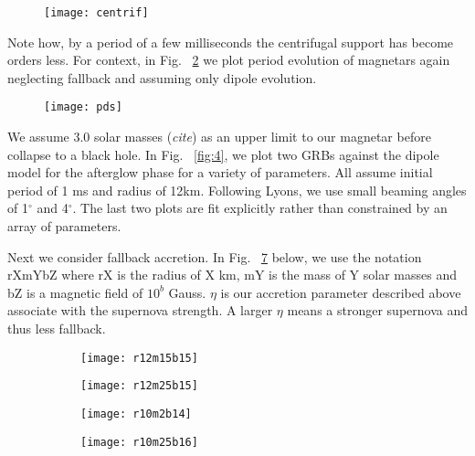 \documentclass{article}
\begin{document}
\begin{figure}[h!]
\centering
\texttt{[image: centrif]}
\caption{}
\label{fig:2}
\end{figure}

Note how, by a period of a few milliseconds the centrifugal support has become orders less. For context, in Fig. ~\ref{fig:3} we plot period evolution of magnetars again neglecting fallback and assuming only dipole evolution.

\begin{figure}[h!]
\centering
\texttt{[image: pds]}
\caption{}
\label{fig:3}
\end{figure}

We assume 3.0 solar masses (\textit{cite}) as an upper limit to our magnetar before collapse to a black hole. In Fig. ~\ref{fig:4}, we plot two GRBs against the dipole model for the afterglow phase for a variety of parameters. All assume initial period of 1 ms and radius of 12km. Following Lyons, we use small beaming angles of 1$^{\circ}$ and 4$^{\circ}$. The last two plots are fit explicitly rather than constrained by an array of parameters.

Next we consider fallback accretion. In Fig. ~\ref{fig:5} below, we use the notation rXmYbZ where rX is the radius of X km, mY is the mass of Y solar masses and bZ is a magnetic field of $10^b$ Gauss. $\eta$ is our accretion parameter described above associate with the supernova strength. A larger $\eta$ means a stronger supernova and thus less fallback.
\begin{figure}[h!]
\centering
\begin{subfigure}{.5\textwidth}
    \centering
    \texttt{[image: r12m15b15]}
    \caption{}
    \label{}
\end{subfigure}%
\begin{subfigure}{.5\textwidth}
    \centering
    \texttt{[image: r12m25b15]}
    \caption{}
    \label{}
\end{subfigure}
\begin{subfigure}{.5\textwidth}
    \centering
    \texttt{[image: r10m2b14]}
    \caption{}
    \label{}
\end{subfigure}%
\begin{subfigure}{.5\textwidth}
    \centering
    \texttt{[image: r10m25b16]}
    \caption{}
    \label{}
\end{subfigure}
\caption{}
\label{fig:5}
\end{figure}
\end{document}
